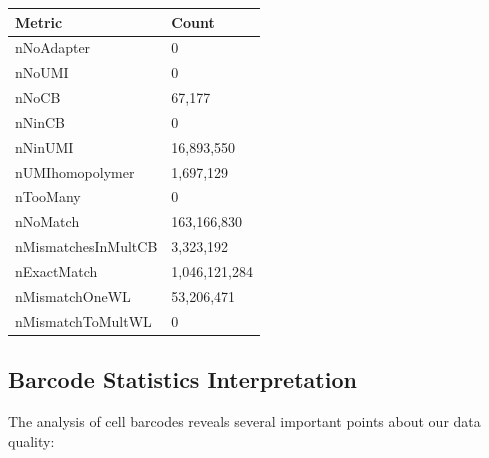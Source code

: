\documentclass[
  11pt,
  a4paper,
]{report}
\begin{document}
\begin{table}
\begin{minipage}{\linewidth}
\end{minipage}%

\end{table}%

\begin{table}

\caption{\label{tbl-starsolo}STARsolo barcode statistics}

\begin{minipage}{\linewidth}

\begin{longtable}[]{@{}ll@{}}
\toprule\noalign{}
Metric & Count \\
\midrule\noalign{}
\endhead
\bottomrule\noalign{}
\endlastfoot
nNoAdapter & 0 \\
nNoUMI & 0 \\
nNoCB & 67,177 \\
nNinCB & 0 \\
nNinUMI & 16,893,550 \\
nUMIhomopolymer & 1,697,129 \\
nTooMany & 0 \\
nNoMatch & 163,166,830 \\
nMismatchesInMultCB & 3,323,192 \\
nExactMatch & 1,046,121,284 \\
nMismatchOneWL & 53,206,471 \\
nMismatchToMultWL & 0 \\
\end{longtable}

\end{minipage}%

\end{table}%

\subsection{Barcode Statistics
Interpretation}\label{barcode-statistics-interpretation}

The analysis of cell barcodes reveals several important points about our
data quality:
\end{document}
